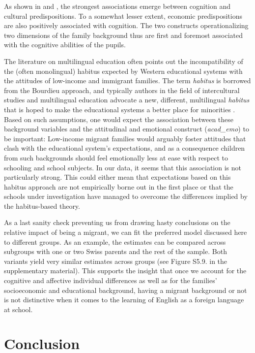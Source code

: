 \documentclass[output=paper]{langsci/langscibook}
\begin{document}
As shown in  and , the strongest associations emerge between cognition and cultural predispositions. To a somewhat lesser extent, economic predispositions are also positively associated with cognition. The two constructs operationalizing two dimensions of the family background thus are first and foremost associated with the cognitive abilities of the pupils. 

The literature on multilingual education often points out the incompatibility of the (often monolingual) habitus expected by Western educational systems with the attitudes of low-income and immigrant families. The term \textit{habitus} is borrowed from the Bourdieu approach, and typically authors in the field of intercultural studies and multilingual education advocate a new, different, multilingual \textit{habitus} that is hoped to make the educational systems a better place for minorities \citep{Gogolin1994}. Based on such assumptions, one would expect the association between these background variables and the attitudinal and emotional construct (\textit{acad\_emo}) to be important: Low-income migrant families would arguably foster attitudes that clash with the educational system’s expectations, and as a consequence children from such backgrounds should feel emotionally less at ease with respect to schooling and school subjects. In our data, it seems that this association is not particularly strong. This could either mean that expectations based on this habitus approach are not empirically borne out in the first place or that the schools under investigation have managed to overcome the differences implied by the habitus-based theory.

As a last sanity check preventing us from drawing hasty conclusions on the relative impact of being a migrant, we can fit the preferred model discussed here to different groups. As an example, the estimates can be compared across subgroups with one or two Swiss parents and the rest of the sample. Both variants yield very similar estimates across groups (see Figure S5.9. in the supplementary material). This supports the insight that once we account for the cognitive and affective individual differences as well as for the families’ socioeconomic and educational background, having a migrant background or not is not distinctive when it comes to the learning of English as a foreign language at school.

\section{Conclusion}
\end{document}

